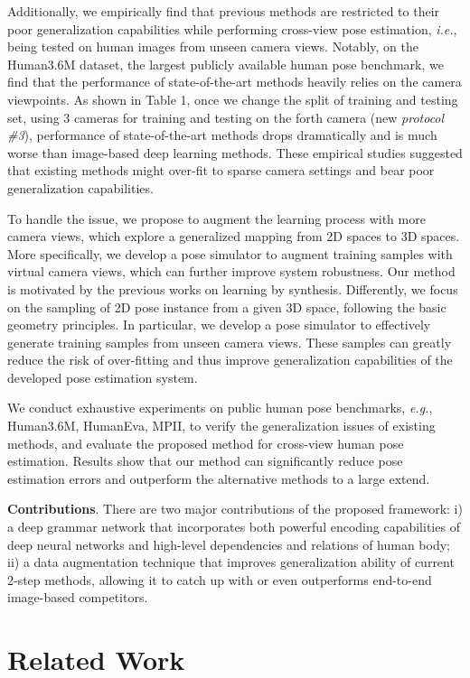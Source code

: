 \documentclass[letterpaper]{article} \usepackage{aaai18}  \usepackage{times}  \usepackage{helvet}  \usepackage{courier}  \usepackage{url}  \usepackage{color}
\begin{document}
Additionally, we empirically find that previous methods are restricted to their poor generalization capabilities while performing cross-view pose estimation, \textit{i.e.}, being tested on human images from unseen camera views. Notably, on the Human3.6M dataset, the largest publicly available human pose benchmark, we find that the performance of state-of-the-art methods heavily relies on the camera viewpoints. As shown in Table 1, once we change the split of training and testing set, using 3 cameras for training and testing on the forth camera (new \textit{protocol \#3}), performance of state-of-the-art methods drops dramatically and is much worse than image-based deep learning methods. These empirical studies suggested that existing methods might over-fit to sparse camera settings and bear poor generalization capabilities.

To handle the issue, we propose to augment the learning process with more camera views, which explore a generalized mapping from 2D spaces to 3D spaces. More specifically, we develop a pose simulator to augment training samples with virtual camera views, which can further improve system robustness. Our method is motivated by the previous works on learning by synthesis. Differently, we focus on the sampling of 2D pose instance from a given 3D space, following the basic geometry principles. In particular, we develop a pose simulator to effectively generate training samples from unseen camera views. These samples can greatly reduce the risk of over-fitting and thus improve generalization capabilities of the developed pose estimation system.

We conduct exhaustive experiments on public human pose benchmarks, \textit{e.g.}, Human3.6M, HumanEva, MPII, to verify the generalization issues of existing methods, and evaluate the proposed method for cross-view human pose estimation. Results show that our method can significantly reduce pose estimation errors and outperform the alternative methods to a large extend.

\textbf{Contributions}. There are two major contributions of the proposed framework: i) a deep grammar network that incorporates both powerful encoding capabilities of deep neural networks and high-level dependencies and relations of human body; ii) a data augmentation technique that improves generalization ability of current 2-step methods, allowing it to catch up with or even outperforms end-to-end image-based competitors.


\section{Related Work} \label{sec:literature}
\end{document}
